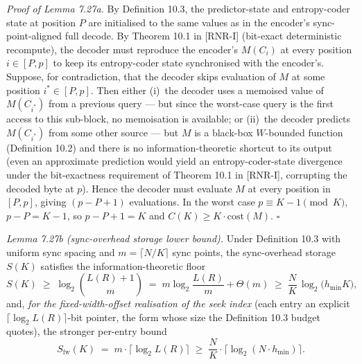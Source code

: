 \documentclass[
]{article}
\begin{document}
\emph{Proof of Lemma 7.27a.} By Definition 10.3, the
predictor-state and entropy-coder state at position $P$ are
initialised to the same values as in the encoder's sync-point-aligned
full decode. By Theorem 10.1 in [RNR-I] (bit-exact deterministic recompute), the
decoder must reproduce the encoder's $M(C_i)$ at every position
$i \in [P, p]$ to keep its entropy-coder state synchronised with the
encoder's. Suppose, for contradiction, that the decoder skips
evaluation of $M$ at some position $i^* \in [P, p]$. Then either
(i)~the decoder uses a memoised value of $M(C_{i^*})$ from a previous
query --- but since the worst-case query is the first access to this
sub-block, no memoisation is available; or (ii)~the decoder predicts
$M(C_{i^*})$ from some other source --- but $M$ is a black-box
$W$-bounded function (Definition 10.2) and there is no
information-theoretic shortcut to its output (even an approximate
prediction would yield an entropy-coder-state divergence under the
bit-exactness requirement of Theorem 10.1 in [RNR-I], corrupting
the decoded byte at $p$). Hence the decoder must evaluate $M$
at every position in $[P, p]$, giving $(p - P + 1)$ evaluations.
In the worst case $p \equiv K - 1 \pmod{K}$, $p - P = K - 1$, so
$p - P + 1 = K$ and $C(K) \geq K \cdot \mathrm{cost}(M)$.
\hfill$\square$

\emph{Lemma 7.27b (sync-overhead storage lower bound).} Under
Definition 10.3 with uniform sync spacing and $m = \lceil N/K
\rceil$ sync points, the sync-overhead storage $S(K)$ satisfies the
information-theoretic floor
\[
  S(K) \;\geq\; \log_2 \binom{L(R)+1}{m}
  \;=\; m \log_2\!\frac{L(R)}{m} + \Theta(m)
  \;\geq\; \frac{N}{K}\,\log_2\!\bigl(h_{\min} K\bigr) ,
\]
and, \emph{for the fixed-width-offset realisation of the seek index}
(each entry an explicit $\lceil \log_2 L(R)\rceil$-bit pointer, the
form whose size the Definition 10.3 budget quotes), the stronger
per-entry bound
\[
  S_{\mathrm{fw}}(K) \;=\; m \cdot \bigl\lceil \log_2 L(R) \bigr\rceil
  \;\geq\; \frac{N}{K} \cdot \bigl\lceil \log_2(N \cdot h_{\min})
  \bigr\rceil .
\]
\end{document}
